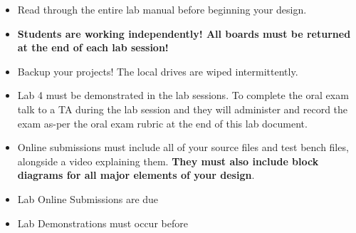 \begin{itemize}
    \item Read through the entire lab manual before beginning your design.
    \item \textbf{Students are working independently! All boards must be returned at the end of each lab session!}
    \item Backup your projects! The local drives are wiped intermittently.
    \item Lab 4 must be demonstrated in the lab sessions. To complete the oral exam talk to a TA during the lab session and they will administer and record the exam as-per the oral exam rubric at the end of this lab document.  
    \item Online submissions must include all of your source files and test bench files, alongside a video explaining them. \textbf{They must also include block diagrams for all major elements of your design}. 
    \item Lab Online Submissions are due \labFourSimsDue
    \item Lab Demonstrations must occur before \labFourDemoDue
    
\end{itemize}
